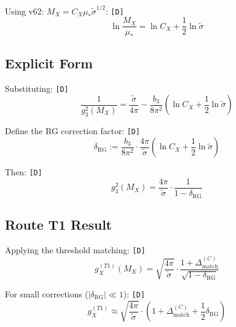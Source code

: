 \documentclass[11pt,a4paper]{article}
\newcommand{\tagD}{\textcolor{green!50!black}{\texttt{[D]}}}
\theoremstyle{definition}
\begin{document}
Using v62: $M_X = C_X \mu_* \tilde{\sigma}^{1/2}$: \tagD{}
\begin{equation}
\label{eq:log-ratio}
\ln\frac{M_X}{\mu_*} = \ln C_X + \frac{1}{2}\ln\tilde{\sigma}
\end{equation}

\subsection{Explicit Form}
\label{subsec:route-t1-explicit}

Substituting: \tagD{}
\begin{equation}
\label{eq:route-t1-explicit}
\frac{1}{g_3^2(M_X)} = \frac{\tilde{\sigma}}{4\pi} - \frac{b_3}{8\pi^2}\left(\ln C_X + \frac{1}{2}\ln\tilde{\sigma}\right)
\end{equation}

Define the RG correction factor: \tagD{}
\begin{equation}
\label{eq:rg-correction-factor}
\delta_{\text{RG}} := \frac{b_3}{8\pi^2} \cdot \frac{4\pi}{\tilde{\sigma}} \left(\ln C_X + \frac{1}{2}\ln\tilde{\sigma}\right)
\end{equation}

Then: \tagD{}
\begin{equation}
\label{eq:g3-mx-corrected}
g_3^2(M_X) = \frac{4\pi}{\tilde{\sigma}} \cdot \frac{1}{1 - \delta_{\text{RG}}}
\end{equation}

\subsection{Route T1 Result}
\label{subsec:route-t1-result}

\begin{derivbox}
Applying the threshold matching: \tagD{}
\begin{equation}
\label{eq:gx-route-t1-boxed}
\boxed{g_X^{(T1)}(M_X) = \sqrt{\frac{4\pi}{\tilde{\sigma}}} \cdot \frac{1 + \Delta_{\text{match}}^{(C)}}{\sqrt{1 - \delta_{\text{RG}}}}}
\end{equation}

For small corrections ($|\delta_{\text{RG}}| \ll 1$): \tagD{}
\begin{equation}
\label{eq:gx-route-t1-expanded}
g_X^{(T1)} \approx \sqrt{\frac{4\pi}{\tilde{\sigma}}} \cdot \left(1 + \Delta_{\text{match}}^{(C)} + \frac{1}{2}\delta_{\text{RG}}\right)
\end{equation}
\end{derivbox}
\end{document}
